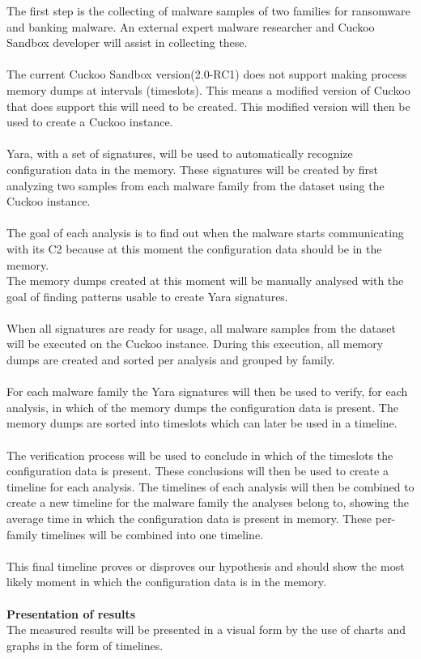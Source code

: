 \documentclass[conference]{IEEEtran}
\begin{document}
The first step is the collecting of malware samples of two families for ransomware and banking malware. An external expert malware researcher and Cuckoo Sandbox developer will assist in collecting these. \\\\The current Cuckoo Sandbox version(2.0-RC1) does not support making process memory  dumps at intervals (timeslots). This means a modified version of Cuckoo that does support this will need to be created. This modified version will then be used to create a Cuckoo instance.\\\\Yara, with a set of signatures, will be used to automatically recognize configuration data in the memory. These signatures will be created by first analyzing two samples from each malware family from the dataset using the Cuckoo instance. \\\\The goal of each analysis is to find out when the malware starts communicating with its C2 because at this moment the configuration data should be in the memory.\\The memory dumps created at this moment will be manually analysed with the goal of finding patterns usable to create Yara signatures.\\\\ When all signatures are ready for usage, all malware samples from the dataset will be executed on the Cuckoo instance. During this execution, all memory dumps are created and sorted per analysis and grouped by family.\\\\For each malware family the Yara signatures will then be used to verify, for each analysis, in which of the memory dumps the configuration data is present. The memory dumps are sorted into timeslots which can later be used in a timeline.\\\\The verification process will be used to conclude in which of the timeslots the configuration data is present. These conclusions will then be used to create a timeline for each analysis.  The timelines of each analysis will then be combined to create a new timeline for the malware family the analyses belong to, showing the average time in which the configuration data is present in memory. These per-family timelines will be combined into one timeline. \\\\This final timeline proves or disproves our hypothesis and should show the most likely moment in which the configuration data is in the memory.\\\\ \textbf{Presentation of results}\\
The measured results will be presented in a visual form by the use of charts and graphs in the form of timelines.
\end{document}
